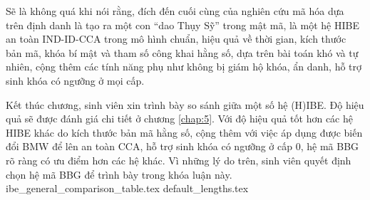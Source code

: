 \documentclass[class=report, crop=false]{standalone}
\begin{document}
		Sẽ là không quá khi nói rằng, đích đến cuối cùng của nghiên cứu mã hóa dựa trên định danh là tạo ra một con ``dao Thụy Sỹ'' trong mật mã, là một hệ HIBE an toàn IND-ID-CCA trong mô hình chuẩn, hiệu quả về thời gian, kích thước bản mã, khóa bí mật và tham số công khai hằng số, dựa trên bài toán khó và tự nhiên, cộng thêm các tính năng phụ như không bị giám hộ khóa, ẩn danh, hỗ trợ sinh khóa có ngưỡng ở mọi cấp.

		Kết thúc chương, sinh viên xin trình bày so sánh giữa một số hệ (H)IBE. Độ hiệu quả sẽ được đánh giá chi tiết ở chương \ref{chap:5}. Với độ hiệu quả tốt hơn các hệ HIBE khác do kích thước bản mã hằng số, cộng thêm với việc áp dụng được biến đổi BMW để lên an toàn CCA, hỗ trợ sinh khóa có ngưỡng ở cấp 0, hệ mã BBG rõ ràng có ưu điểm hơn các hệ khác. Vì những lý do trên, sinh viên quyết định chọn hệ mã BBG để trình bày trong khóa luận này.
		\newpage
		{ibe_general_comparison_table.tex}
	{default_lengths.tex}
\end{document}
